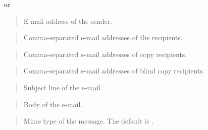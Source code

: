 \documentclass[letterpaper,10pt,english,openany,oneside]{sphinxmanual}
\begin{document}
or



\begin{quote}

E-mail address of the sender.
\end{quote}

\begin{quote}

Comma-separated e-mail addresses of the recipients.
\end{quote}

\begin{quote}

Comma-separated e-mail addresses of copy recipients.
\end{quote}

\begin{quote}

Comma-separated e-mail addresses of blind copy recipients.
\end{quote}

\begin{quote}

Subject line of the e-mail.
\end{quote}

\begin{quote}

Body of the e-mail.
\end{quote}

\begin{quote}

Mime type of the message. The default is .
\end{quote}
\end{document}
